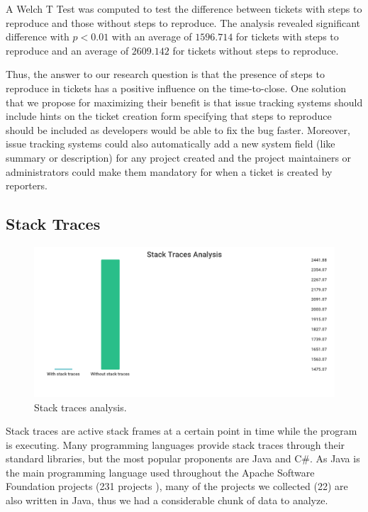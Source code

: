 \documentclass{mpaper}
\begin{document}
A Welch T Test was computed to test the difference between tickets with steps to reproduce 
and those without steps to reproduce. The analysis revealed significant difference with 
$p < 0.01$ with an average of $1596.714$ for tickets with steps to reproduce and an average of 
$2609.142$ for tickets without steps to reproduce.

Thus, the answer to our research question is that the presence of steps to reproduce in tickets 
has a positive influence on the time-to-close. One solution that we propose for maximizing their benefit 
is that issue tracking systems should include hints on the ticket creation form specifying that 
steps to reproduce should be included as developers would be able to fix the bug faster. Moreover, 
issue tracking systems could also automatically add a new system field (like summary or description) 
for any project created and the project maintainers or administrators could make them mandatory for 
when a ticket is created by reporters.

\subsection{Stack Traces}

\begin{figure}[ht]
  \begin{center}
    \includegraphics[scale=0.23]{images/stack_traces.png}
  \end{center}
  \caption{\label{stack_traces}Stack traces analysis.}
\end{figure}

Stack traces are active stack frames at a certain point in time while the program is executing. 
Many programming languages provide stack traces through their standard libraries, but the most 
popular proponents are Java and C\#. As Java is the main programming language used throughout 
the Apache Software Foundation projects (231 projects \cite{apache_projects}), many of the projects 
we collected (22) are also written in Java, thus we had a considerable chunk of data to analyze.
\end{document}
